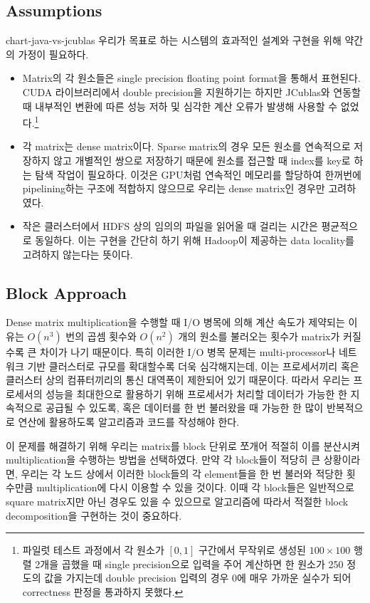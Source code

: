 \documentclass[a4paper]{article}
\begin{document}
\begin{multicols}{2}
\subsection{Assumptions}chart-java-vs-jcublas
우리가 목표로 하는 시스템의 효과적인 설계와 구현을 위해 약간의 가정이 필요하다.
\begin{itemize}
	\item Matrix의 각 원소들은 single precision floating point format을 통해서 표현된다. CUDA 라이브러리에서 double precision을 지원하기는 하지만 JCublas와 연동할 때 내부적인 변환에 따른 성능 저하 및 심각한 계산 오류가 발생해 사용할 수 없었다.\footnote{파일럿 테스트 과정에서 각 원소가 $[0,1]$ 구간에서 무작위로 생성된 $100 \times 100$ 행렬 2개을 곱했을 때 single precision으로 입력을 주어 계산하면 한 원소가 250 정도의 값을 가지는데 double precision 입력의 경우 0에 매우 가까운 실수가 되어 correctness 판정을 통과하지 못했다.}
	\item 각 matrix는 dense matrix이다. Sparse matrix의 경우 모든 원소를 연속적으로 저장하지 않고 개별적인 쌍으로 저장하기 때문에 원소를 접근할 때 index를 key로 하는 탐색 작업이 필요하다. 이것은 GPU처럼 연속적인 메모리를 할당하여 한꺼번에 pipelining하는 구조에 적합하지 않으므로 우리는 dense matrix인 경우만 고려하였다.
	\item 작은 클러스터에서 HDFS 상의 임의의 파일을 읽어올 때 걸리는 시간은 평균적으로 동일하다. 이는 구현을 간단히 하기 위해 Hadoop이 제공하는 data locality를 고려하지 않는다는 뜻이다.
\end{itemize}

\subsection{Block Approach}
Dense matrix multiplication을 수행할 때 I/O 병목에 의해 계산 속도가 제약되는 이유는 $O(n^3)$ 번의 곱셈 횟수와 $O(n^2)$ 개의 원소를 불러오는 횟수가 matrix가 커질수록 큰 차이가 나기 때문이다.
특히 이러한 I/O 병목 문제는 multi-processor나 네트워크 기반 클러스터로 규모를 확대할수록 더욱 심각해지는데, 이는 프로세서끼리 혹은 클러스터 상의 컴퓨터끼리의 통신 대역폭이 제한되어 있기 때문이다.
따라서 우리는 프로세서의 성능을 최대한으로 활용하기 위해 프로세서가 처리할 데이터가 가능한 한 지속적으로 공급될 수 있도록, 혹은 데이터를 한 번 불러왔을 때 가능한 한 많이 반복적으로 연산에 활용하도록 알고리즘과 코드를 작성해야 한다.

이 문제를 해결하기 위해 우리는 matrix를 block 단위로 쪼개어 적절히 이를 분산시켜 multiplication을 수행하는 방법을 선택하였다.
만약 각 block들이 적당히 큰 상황이라면, 우리는 각 노드 상에서 이러한 block들의 각 element들을 한 번 불러와 적당한 횟수만큼 multiplication에 다시 이용할 수 있을 것이다.
이때 각 block들은 일반적으로 square matrix지만 아닌 경우도 있을 수 있으므로 알고리즘에 따라서 적절한 block decomposition을 구현하는 것이 중요하다.


\end{multicols}
\end{document}
